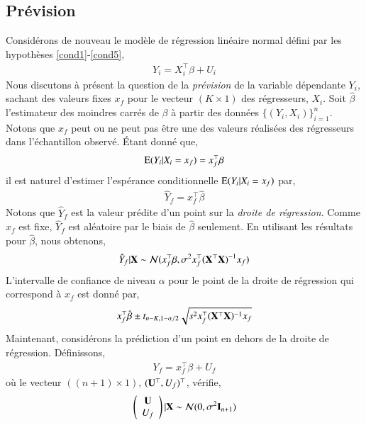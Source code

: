 \documentclass[10pt, reqno]{amsart}
\begin{document}
\subsection{Prévision}
Considérons de nouveau le modèle de régression linéaire normal défini par les hypothèses \ref{cond1}-\ref{cond5},
\begin{align*}
Y_i = X_i^\top\beta+U_i
\end{align*}
Nous discutons à présent la question de la \emph{prévision} de la variable dépendante $Y_i$, sachant des valeurs fixes $x_f$ pour le vecteur $(K\times 1)$ des régresseurs, $X_i$. Soit $\hat{\beta}$ l'estimateur des moindres carrés de $\beta$ à partir des données $\{(Y_i, X_i)\}_{i=1}^n$. Notons que $x_f$ peut ou ne peut pas être une des valeurs réalisées des régresseurs dans l'échantillon observé. \'Etant donné que,
\begin{align*}
\operatorname{E}(Y_i| X_i=x_f) = x_f^\top\beta
\end{align*} 
il est naturel d'estimer l'espérance conditionnelle $\operatorname{E}(Y_i|X_i =x_f)$ par,
\begin{align}
\hat{Y}_f = x_f^\top\hat{\beta}
\label{eq54}
\end{align}
Notons que $\hat{Y}_f$ est la valeur prédite d'un point sur la \emph{droite de régression}. Comme $x_f$ est fixe, $\hat{Y}_f $ est aléatoire par le biais de $\hat{\beta}$ seulement. En utilisant les résultats pour $\hat{\beta}$, nous obtenons,
\begin{align*}
\hat{Y}_f|\mathbf X \sim \mathcal{N}(x_f^\top\beta, \sigma^2x_f^\top(\mathbf X^\top\mathbf X)^{-1}x_f)
\end{align*}
L'intervalle de confiance de niveau $\alpha$ pour le point de la droite de régression qui correspond à $x_f$ est donné par,
\begin{align*}
x_f^\top\hat{\beta} \pm t_{n-K, 1-\alpha/2}\sqrt{s^2x_f^\top (\mathbf X^\top\mathbf X)^{-1}x_f}
\end{align*}
Maintenant, considérons la prédiction d'un point en dehors de la droite de régression. Définissons,
\begin{align*}
Y_f = x_f^\top\beta + U_f
\end{align*}
où le vecteur $((n+1) \times 1)$, $(\mathbf U^\top, U_f)^\top$, vérifie,
\begin{align}
\left(
\begin{array}{c}
\mathbf U\\
U_f
\end{array}
\right)|\mathbf X
\sim
\mathcal{N}(0, \sigma^2\mathbf{I}_{n+1})
\label{eq55}
\end{align}
\end{document}
